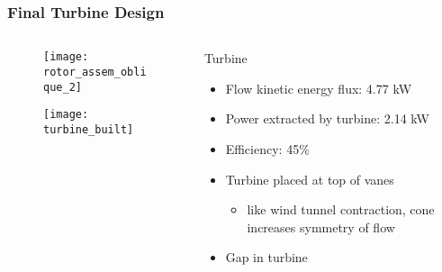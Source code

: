 \documentclass[mathserif]{beamer}
\begin{document}
%
%
\begin{frame}
 \frametitle{Final Turbine Design}

\begin{columns}[]
  \begin{column}{0.4\linewidth}
 
    \begin{figure}[htb]
     \centering
     \texttt{[image: rotor\_assem\_oblique\_2]}
    \end{figure}

    \begin{figure}[htb]
     \centering
     \texttt{[image: turbine\_built]}
    \end{figure}

  \end{column}
  \begin{column}{0.6\linewidth}
 
 \begin{block}{Turbine}
 \begin{itemize}
 \item Flow kinetic energy flux: 4.77 kW
 \item Power extracted by turbine: 2.14 kW
 \item Efficiency: 45\%   
 \item Turbine placed at top of vanes
   \begin{itemize}
   \item like wind tunnel contraction, cone increases symmetry of flow
   \end{itemize}	
 \item Gap in turbine 
 \end{itemize} 
 \end{block}

 \end{column}
 \end{columns}

\end{frame}
\end{document}
